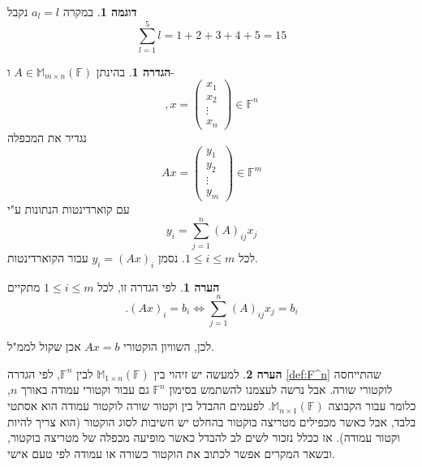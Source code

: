 \documentclass[12pt]{report}
\theoremstyle{plain}
\theoremstyle{definition}
\newtheorem{definition}[theorem]{הגדרה}
\newtheorem{example}{דוגמה}[chapter]
\newtheorem{remark}{הערה}[chapter]
\newcommand{\F}{\mathbb{F}}
\newcommand{\M}{\mathbb{M}}
\newcommand{\0}{\mathbf{0}}
\begin{document}
\begin{example}
במקרה
$a_l=l$
נקבל
$$
\sum_{l=1}^{5} l=1+2+3+4+5=15
$$
\end{example}

\begin{definition}
בהינתן
$A\in\M_{m\times n}(\F)$
ו-
$$
,x=\begin{pmatrix}
x_1\\
x_2\\
\vdots \\
x_n
\end{pmatrix}\in\F^n
$$
נגדיר את המכפלה
$$
Ax=\begin{pmatrix}
y_1\\
y_2\\
\vdots \\
y_m
\end{pmatrix}\in\F^m
$$
עם קוארדינטות הנתונות ע"י
$$
y_i=\sum_{j=1}^n (A)_{ij}x_j
$$
לכל
$1\leq i\leq m$.
נסמן
$y_i=(Ax)_i$ 
עבור הקוארדינטות.
\end{definition}

\begin{remark}
לפי הגדרה זו, לכל 
$1\leq i\leq m$
מתקיים
$$
.(Ax)_i=b_i \iff \sum_{j=1}^n (A)_{ij}x_j=b_i
$$

לכן, השוויון הוקטורי
$Ax=b$
אכן שקול לממ"ל.
\end{remark}

\begin{remark}
למעשה יש זיהוי בין
$\M_{1\times n}(\F)$
לבין 
$\F^n$,
לפי הגדרה
\ref{def:F^n} 
שהתייחסה לוקטורי שורה. אבל נרשה לעצמנו להשתמש בסימון 
$\F^n$
גם עבור וקטורי עמודה באורך
$n$,
כלומר עבור הקבוצה
$\M_{n\times 1}(\F)$. 
לפעמים ההבדל בין וקטור שורה לוקטור עמודה הוא אסתטי בלבד,
אבל כאשר מכפילים מטריצה בוקטור בהחלט יש חשיבות לסוג הוקטור (הוא צריך להיות וקטור עמודה). אז ככלל נזכור לשים לב להבדל כאשר מופיעה מכפלה של מטריצה בוקטור, ובשאר המקרים אפשר לכתוב את הוקטור כשורה או עמודה לפי טעם אישי.
\end{remark}
\end{document}
